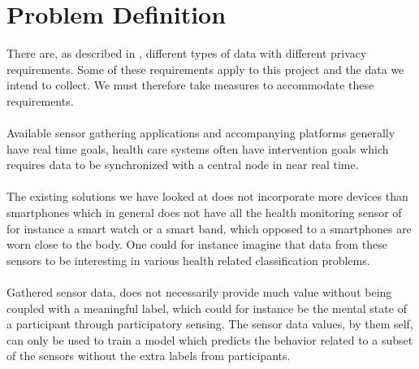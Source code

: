 
\section{Problem Definition} 
\label{sec:problem_definition}
There are, as described in , different types of data with different privacy requirements. Some of these requirements apply to this project and the data we intend to collect. We must therefore take measures to accommodate these requirements.    
\\\\
Available sensor gathering applications and accompanying platforms generally have real time goals, health care systems often have intervention goals which requires data to be synchronized with a central node in near real time. 
\\\\
The existing solutions we have looked at does not incorporate more devices than smartphones which in general does not have all the health monitoring sensor of for instance a smart watch or a smart band, which opposed to a smartphones are worn close to the body. One could for instance imagine that data from these sensors to be interesting in various health related classification problems. 
\\\\
Gathered sensor data, does not necessarily provide much value without being coupled with a meaningful label, which could for instance be the mental state of a participant through participatory sensing. The sensor data values, by them self, can only be used to train a model which predicts the behavior related to a subset of the sensors without the extra labels from participants. 

